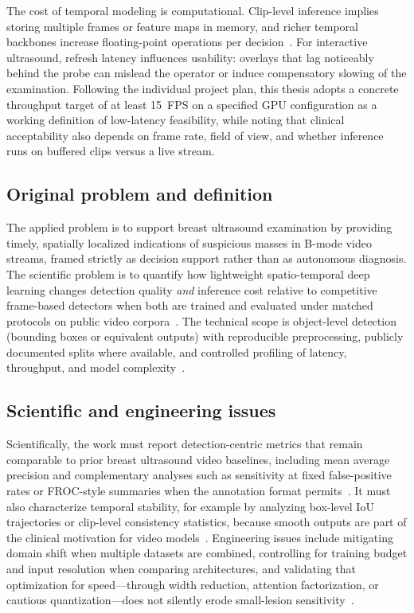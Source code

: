 \documentclass[
english,                 %
bibtex,                  %
]{kththesis}
\numberwithin{listing}{chapter}
\begin{document}
The cost of temporal modeling is computational.
Clip-level inference implies storing multiple frames or feature maps in memory, and richer temporal backbones increase floating-point operations per decision~\cite{huang2023_3dcnn_video_review,bertasius2021_spacetime_attention}.
For interactive ultrasound, refresh latency influences usability: overlays that lag noticeably behind the probe can mislead the operator or induce compensatory slowing of the examination.
Following the individual project plan, this thesis adopts a concrete throughput target of at least \SI{15}{FPS} on a specified GPU configuration as a working definition of low-latency feasibility, while noting that clinical acceptability also depends on frame rate, field of view, and whether inference runs on buffered clips versus a live stream.

\subsection{Original problem and definition}
\label{sec:researchQuestion}

The applied problem is to support breast ultrasound examination by providing timely, spatially localized indications of suspicious masses in B-mode video streams, framed strictly as decision support rather than as autonomous diagnosis.
The scientific problem is to quantify how lightweight spatio-temporal deep learning changes detection quality \emph{and} inference cost relative to competitive frame-based detectors when both are trained and evaluated under matched protocols on public video corpora~\cite{lin2022_buv_miccai}.
The technical scope is object-level detection (bounding boxes or equivalent outputs) with reproducible preprocessing, publicly documented splits where available, and controlled profiling of latency, throughput, and model complexity~\cite{liu2023_edgemednet}.

\subsection{Scientific and engineering issues}

Scientifically, the work must report detection-centric metrics that remain comparable to prior breast ultrasound video baselines, including mean average precision and complementary analyses such as sensitivity at fixed false-positive rates or FROC-style summaries when the annotation format permits~\cite{lin2022_buv_miccai,lin2017_focal_loss_retinanet}.
It must also characterize temporal stability, for example by analyzing box-level IoU trajectories or clip-level consistency statistics, because smooth outputs are part of the clinical motivation for video models~\cite{zhao2023_dynamic_us_video}.
Engineering issues include mitigating domain shift when multiple datasets are combined, controlling for training budget and input resolution when comparing architectures, and validating that optimization for speed---through width reduction, attention factorization, or cautious quantization---does not silently erode small-lesion sensitivity~\cite{liu2023_edgemednet,dan2024_breast_us_dl_review}.
\end{document}
